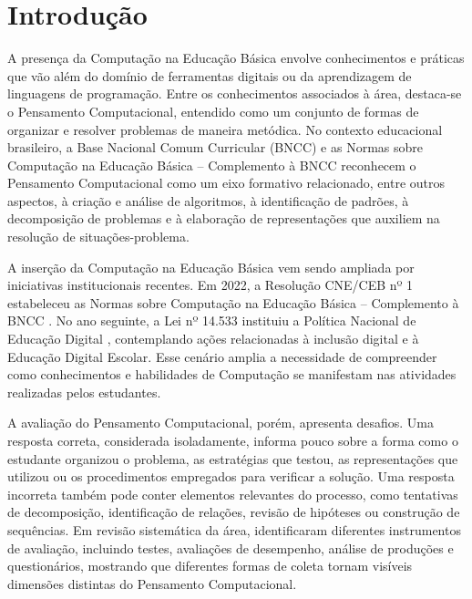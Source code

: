 \section{Introdução}
\label{sec:introducao}

A presença da Computação na Educação Básica envolve conhecimentos e práticas que vão além do domínio de ferramentas digitais ou da aprendizagem de linguagens de programação. Entre os conhecimentos associados à área, destaca-se o Pensamento Computacional, entendido como um conjunto de formas de organizar e resolver problemas de maneira metódica. No contexto educacional brasileiro, a Base Nacional Comum Curricular (BNCC) \cite{brasil2018} e as Normas sobre Computação na Educação Básica -- Complemento à BNCC \cite{cne2022} reconhecem o Pensamento Computacional como um eixo formativo relacionado, entre outros aspectos, à criação e análise de algoritmos, à identificação de padrões, à decomposição de problemas e à elaboração de representações que auxiliem na resolução de situações-problema.

A inserção da Computação na Educação Básica vem sendo ampliada por iniciativas institucionais recentes. Em 2022, a Resolução CNE/CEB nº 1 estabeleceu as Normas sobre Computação na Educação Básica -- Complemento à BNCC \cite{cne2022}. No ano seguinte, a Lei nº 14.533 instituiu a Política Nacional de Educação Digital \cite{brasil2023pned}, contemplando ações relacionadas à inclusão digital e à Educação Digital Escolar. Esse cenário amplia a necessidade de compreender como conhecimentos e habilidades de Computação se manifestam nas atividades realizadas pelos estudantes.

A avaliação do Pensamento Computacional, porém, apresenta desafios. Uma resposta correta, considerada isoladamente, informa pouco sobre a forma como o estudante organizou o problema, as estratégias que testou, as representações que utilizou ou os procedimentos empregados para verificar a solução. Uma resposta incorreta também pode conter elementos relevantes do processo, como tentativas de decomposição, identificação de relações, revisão de hipóteses ou construção de sequências. Em revisão sistemática da área,  identificaram diferentes instrumentos de avaliação, incluindo testes, avaliações de desempenho, análise de produções e questionários, mostrando que diferentes formas de coleta tornam visíveis dimensões distintas do Pensamento Computacional.

